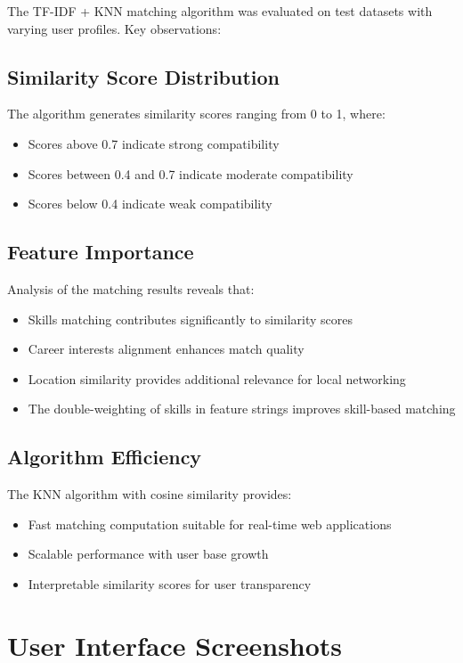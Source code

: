 \documentclass[12pt,a4paper]{report}
\let\origsection\section
\renewcommand{\section}{\needspace{4\baselineskip}\origsection}
\let\origsubsection\subsection
\renewcommand{\subsection}{\needspace{4\baselineskip}\origsubsection}
\begin{document}
The TF-IDF + KNN matching algorithm was evaluated on test datasets with varying user profiles. Key observations:

\subsection{Similarity Score Distribution}

The algorithm generates similarity scores ranging from 0 to 1, where:
\begin{itemize}[noitemsep]
    \item Scores above 0.7 indicate strong compatibility
    \item Scores between 0.4 and 0.7 indicate moderate compatibility
    \item Scores below 0.4 indicate weak compatibility
\end{itemize}

\subsection{Feature Importance}

Analysis of the matching results reveals that:
\begin{itemize}[noitemsep]
    \item Skills matching contributes significantly to similarity scores
    \item Career interests alignment enhances match quality
    \item Location similarity provides additional relevance for local networking
    \item The double-weighting of skills in feature strings improves skill-based matching
\end{itemize}

\subsection{Algorithm Efficiency}

The KNN algorithm with cosine similarity provides:
\begin{itemize}[noitemsep]
    \item Fast matching computation suitable for real-time web applications
    \item Scalable performance with user base growth
    \item Interpretable similarity scores for user transparency
\end{itemize}

\section{User Interface Screenshots}
\end{document}
